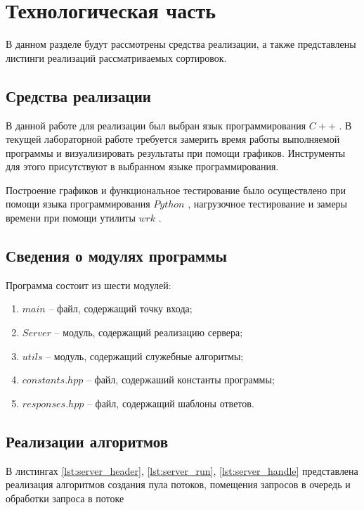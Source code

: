 \chapter{Технологическая часть}

В данном разделе будут рассмотрены средства реализации, а также представлены листинги реализаций рассматриваемых сортировок.

\section{Средства реализации}
В данной работе для реализации был выбран язык программирования $C++$ \cite{cpp-lang}. В текущей лабораторной работе требуется замерить время работы выполняемой программы
и визуализировать результаты при помощи графиков. Инструменты для этого присутствуют в выбранном языке программирования.

Построение графиков и функциональное тестирование было осуществлено при помощи языка программирования $Python$ \cite{python-lang}, нагрузочное тестирование и замеры времени при помощи утилиты $wrk$ \cite{wrk}.

\section{Сведения о модулях программы}
Программа состоит из шести модулей:
\begin{enumerate}[label=\arabic*)]
	\item $main$ -- файл, содержащий точку входа;
	\item $Server$ -- модуль, содержащий реализацию сервера;
	\item $utils$ -- модуль, содержащий служебные алгоритмы;
	\item $constants.hpp$ -- файл, содержаший константы программы;
	\item $responses.hpp$ -- файл, содержащий шаблоны ответов. \newline
\end{enumerate}


\section{Реализации алгоритмов}

В листингах \ref{lst:server_header}, \ref{lst:server_run}, \ref{lst:server_handle} представлена реализация алгоритмов создания пула потоков, помещения запросов в очередь и обработки запроса в потоке\clearpage

